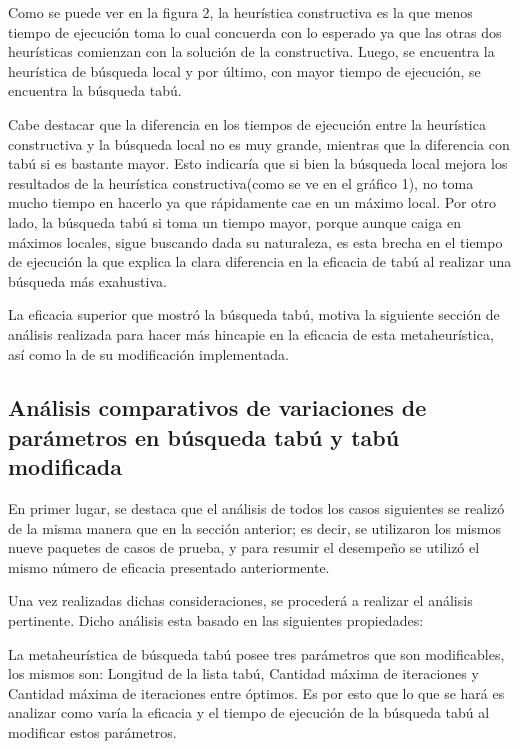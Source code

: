 \documentclass[a4paper,10pt]{article}
\begin{document}
Como se puede ver en la figura 2, la heur\'istica constructiva es la que menos tiempo de ejecuci\'on toma lo cual concuerda con lo esperado ya que las otras dos heur\'isticas comienzan con la soluci\'on de la constructiva. Luego, se encuentra la heur\'istica de b\'usqueda local y por \'ultimo, con mayor tiempo de ejecuci\'on, se encuentra la b\'usqueda tab\'u.

Cabe destacar que la diferencia en los tiempos de ejecuci\'on entre la heur\'istica constructiva y la b\'usqueda local no es muy grande, mientras que la diferencia con tab\'u si es bastante mayor. Esto indicar\'ia que si bien la b\'usqueda local mejora los resultados de la heur\'istica constructiva(como se ve en el gr\'afico 1), no toma mucho tiempo en hacerlo ya que r\'apidamente cae en un m\'aximo local. Por otro lado, la b\'usqueda tab\'u si toma un tiempo mayor, porque aunque caiga en m\'aximos locales, sigue buscando dada su naturaleza, es esta brecha en el tiempo de ejecuci\'on la que explica la clara diferencia en la eficacia de tab\'u al realizar una b\'usqueda m\'as exahustiva.

\bigskip

La eficacia superior que mostr\'o la b\'usqueda tab\'u, motiva la siguiente secci\'on de an\'alisis realizada para hacer m\'as hincapie en la eficacia de esta metaheur\'istica, as\'i como la de su modificaci\'on implementada.

\subsection*{An\'alisis comparativos de variaciones de par\'ametros en b\'usqueda tab\'u y tab\'u modificada}

En primer lugar, se destaca que el an\'alisis de todos los casos siguientes se realiz\'o de la misma manera que en la secci\'on anterior; es decir, se utilizaron los mismos nueve paquetes de casos de prueba, y para resumir el desempe\~{n}o se utiliz\'o el mismo n\'umero de eficacia presentado anteriormente.

Una vez realizadas dichas consideraciones, se proceder\'a a realizar el an\'alisis pertinente. Dicho an\'alisis esta basado en las siguientes propiedades: 

La metaheur\'istica de b\'usqueda tab\'u posee tres par\'ametros que son modificables, los mismos son: Longitud de la lista tab\'u, Cantidad m\'axima de iteraciones y Cantidad m\'axima de iteraciones entre \'optimos. Es por esto que lo que se har\'a es analizar como var\'ia la eficacia y el tiempo de ejecuci\'on de la b\'usqueda tab\'u al modificar estos par\'ametros.
\end{document}
